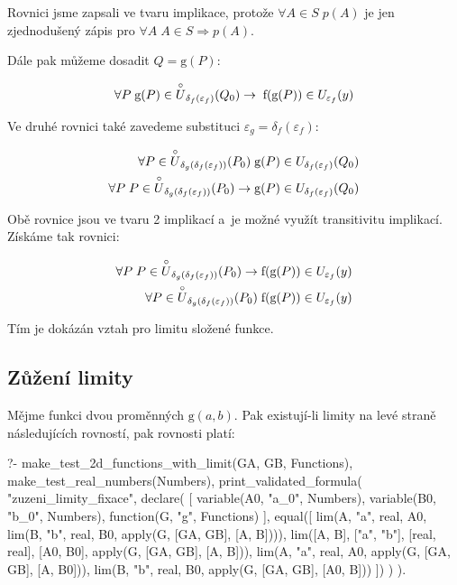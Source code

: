 Rovnici jsme zapsali ve tvaru implikace, protože \(\forall A \in S \; p(A)\) je jen zjednodušený zápis pro \(\forall A \; A \in S \Rightarrow p(A)\). 

Dále pak můžeme dosadit \(Q = \mathrm{g}(P)\):

\begin{equation}
\forall P \; \mathrm{g}(P) \in \overset{\circ}{U}_{\delta_f(\varepsilon_f)}(Q_0) \rightarrow \; \mathrm{f}(\mathrm{g}(P)) \in U_{\varepsilon_f}(y)
\end{equation}

Ve druhé rovnici také zavedeme substituci \(\varepsilon_g = \delta_f(\varepsilon_f)\):

\begin{equation}
\begin{split}
\forall P \in \overset{\circ}{U}_{\delta_g(\delta_f(\varepsilon_f))}(P_0) \; \mathrm{g}(P) \in U_{\delta_f(\varepsilon_f)}(Q_0) \\
\forall P \; P \in \overset{\circ}{U}_{\delta_g(\delta_f(\varepsilon_f))}(P_0) \rightarrow \mathrm{g}(P) \in U_{\delta_f(\varepsilon_f)}(Q_0)
\end{split}
\end{equation}

Obě rovnice jsou ve tvaru 2 implikací a~je možné využít transitivitu implikací. Získáme tak rovnici:

\begin{equation}
\begin{split}
\forall P \; P \in \overset{\circ}{U}_{\delta_g(\delta_f(\varepsilon_f))}(P_0) \rightarrow \mathrm{f}(\mathrm{g}(P)) \in U_{\varepsilon_f}(y) \\
\forall P \in \overset{\circ}{U}_{\delta_g(\delta_f(\varepsilon_f))}(P_0) \; \mathrm{f}(\mathrm{g}(P)) \in U_{\varepsilon_f}(y)
\end{split}
\end{equation}

Tím je dokázán vztah pro limitu složené funkce.

\subsection{Zůžení limity}

Mějme funkci dvou proměnných \(\mathrm{g}(a, b)\). Pak existují-li limity na levé straně následujících rovností, pak rovnosti platí:

\begin{prolog}
?-	make_test_2d_functions_with_limit(GA, GB, Functions),
	make_test_real_numbers(Numbers),
	print_validated_formula(
		"zuzeni_limity_fixace",
		declare(
			[
				variable(A0, "a_0", Numbers),
				variable(B0, "b_0", Numbers),
				function(G, "g", Functions)
			],
			equal([
				lim(A, "a", real, A0, lim(B, "b", real, B0, apply(G, [GA, GB], [A, B]))),
				lim([A, B], ["a", "b"], [real, real], [A0, B0], apply(G, [GA, GB], [A, B])),
				lim(A, "a", real, A0, apply(G, [GA, GB], [A, B0])),
				lim(B, "b", real, B0, apply(G, [GA, GB], [A0, B]))
			])
		)
	).
\end{prolog}

